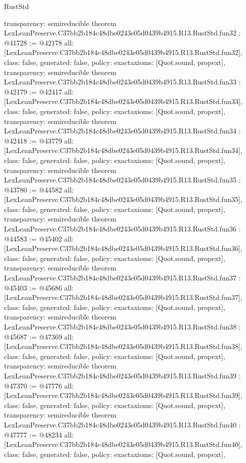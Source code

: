 \begin{lexlean}{RustStd}
\begin{coremodule}
{  transparency: semireducible
}
theorem LexLeanPreserve.C37bb2b184c48dbe0243e05d0439b4915.R13.RustStd.fun32 : @41728 := @42178 {
  all: [LexLeanPreserve.C37bb2b184c48dbe0243e05d0439b4915.R13.RustStd.fun32],
  class: false,
  generated: false,
  policy: exact{axioms: [Quot.sound, propext]},
  transparency: semireducible
}
theorem LexLeanPreserve.C37bb2b184c48dbe0243e05d0439b4915.R13.RustStd.fun33 : @42179 := @42417 {
  all: [LexLeanPreserve.C37bb2b184c48dbe0243e05d0439b4915.R13.RustStd.fun33],
  class: false,
  generated: false,
  policy: exact{axioms: [Quot.sound, propext]},
  transparency: semireducible
}
theorem LexLeanPreserve.C37bb2b184c48dbe0243e05d0439b4915.R13.RustStd.fun34 : @42418 := @43779 {
  all: [LexLeanPreserve.C37bb2b184c48dbe0243e05d0439b4915.R13.RustStd.fun34],
  class: false,
  generated: false,
  policy: exact{axioms: [Quot.sound, propext]},
  transparency: semireducible
}
theorem LexLeanPreserve.C37bb2b184c48dbe0243e05d0439b4915.R13.RustStd.fun35 : @43780 := @44582 {
  all: [LexLeanPreserve.C37bb2b184c48dbe0243e05d0439b4915.R13.RustStd.fun35],
  class: false,
  generated: false,
  policy: exact{axioms: [Quot.sound, propext]},
  transparency: semireducible
}
theorem LexLeanPreserve.C37bb2b184c48dbe0243e05d0439b4915.R13.RustStd.fun36 : @44583 := @45402 {
  all: [LexLeanPreserve.C37bb2b184c48dbe0243e05d0439b4915.R13.RustStd.fun36],
  class: false,
  generated: false,
  policy: exact{axioms: [Quot.sound, propext]},
  transparency: semireducible
}
theorem LexLeanPreserve.C37bb2b184c48dbe0243e05d0439b4915.R13.RustStd.fun37 : @45403 := @45686 {
  all: [LexLeanPreserve.C37bb2b184c48dbe0243e05d0439b4915.R13.RustStd.fun37],
  class: false,
  generated: false,
  policy: exact{axioms: [Quot.sound, propext]},
  transparency: semireducible
}
theorem LexLeanPreserve.C37bb2b184c48dbe0243e05d0439b4915.R13.RustStd.fun38 : @45687 := @47369 {
  all: [LexLeanPreserve.C37bb2b184c48dbe0243e05d0439b4915.R13.RustStd.fun38],
  class: false,
  generated: false,
  policy: exact{axioms: [Quot.sound, propext]},
  transparency: semireducible
}
theorem LexLeanPreserve.C37bb2b184c48dbe0243e05d0439b4915.R13.RustStd.fun39 : @47370 := @47776 {
  all: [LexLeanPreserve.C37bb2b184c48dbe0243e05d0439b4915.R13.RustStd.fun39],
  class: false,
  generated: false,
  policy: exact{axioms: [Quot.sound, propext]},
  transparency: semireducible
}
theorem LexLeanPreserve.C37bb2b184c48dbe0243e05d0439b4915.R13.RustStd.fun40 : @47777 := @48234 {
  all: [LexLeanPreserve.C37bb2b184c48dbe0243e05d0439b4915.R13.RustStd.fun40],
  class: false,
  generated: false,
  policy: exact{axioms: [Quot.sound, propext]},
}
\end{coremodule}
\end{lexlean}
